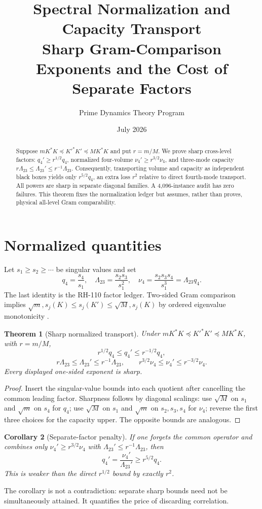 \documentclass[12pt]{article}\usepackage[margin=1in]{geometry}\usepackage{amsmath,amssymb,amsthm,graphicx,natbib,microtype}\newtheorem{theorem}{Theorem}\newtheorem{corollary}[theorem]{Corollary}
\title{Spectral Normalization and Capacity Transport\\\large Sharp Gram-Comparison Exponents and the Cost of Separate Factors}\author{Prime Dynamics Theory Program}\date{July 2026}
\begin{document}
\maketitle
\begin{abstract}
Suppose $mK^*K\preceq K'^*K'\preceq MK^*K$ and put $r=m/M$.  We prove sharp cross-level factors: $q_4'\geq r^{1/2}q_4$, normalized four-volume $\nu_4'\geq r^{3/2}\nu_4$, and three-mode capacity $r\Lambda_{23}\leq\Lambda_{23}'\leq r^{-1}\Lambda_{23}$.  Consequently, transporting volume and capacity as independent black boxes yields only $r^{5/2}q_4$, an extra loss $r^2$ relative to direct fourth-mode transport.  All powers are sharp in separate diagonal families.  A 4,096-instance audit has zero failures.  This theorem fixes the normalization ledger but assumes, rather than proves, physical all-level Gram comparability.
\end{abstract}
\section{Normalized quantities}
Let $s_1\geq s_2\geq\cdots$ be singular values and set
\[
q_4=\frac{s_4}{s_1},\quad \Lambda_{23}=\frac{s_2s_3}{s_1^2},\quad \nu_4=\frac{s_2s_3s_4}{s_1^3}=\Lambda_{23}q_4.
\]
The last identity is the RH-110 factor ledger.  Two-sided Gram comparison
implies $\sqrt m,s_j(K)\leq s_j(K')\leq\sqrt M,s_j(K)$ by ordered
eigenvalue monotonicity \citep{HornJohnson1991,Bhatia2007}.

\begin{theorem}[Sharp normalized transport]\label{thm:transport}
Under $mK^*K\preceq K'^*K'\preceq MK^*K$, with $r=m/M$,
\[
r^{1/2}q_4\leq q_4'\leq r^{-1/2}q_4,
\]
\[
r\Lambda_{23}\leq\Lambda_{23}'\leq r^{-1}\Lambda_{23},\qquad
r^{3/2}\nu_4\leq\nu_4'\leq r^{-3/2}\nu_4.
\]
Every displayed one-sided exponent is sharp.
\end{theorem}
\begin{proof}
Insert the singular-value bounds into each quotient after cancelling the
common leading factor.  Sharpness follows by diagonal scalings: use
$\sqrt M$ on $s_1$ and $\sqrt m$ on $s_4$ for $q_4$; use $\sqrt M$ on
$s_1$ and $\sqrt m$ on $s_2,s_3,s_4$ for $\nu_4$; reverse the first three
choices for the capacity upper.  The opposite bounds are analogous.
\end{proof}

\begin{corollary}[Separate-factor penalty]
If one forgets the common operator and combines only
$\nu_4'\geq r^{3/2}\nu_4$ with
$\Lambda_{23}'\leq r^{-1}\Lambda_{23}$, then
\[
q_4'=\frac{\nu_4'}{\Lambda_{23}'}\geq r^{5/2}q_4.
\]
This is weaker than the direct $r^{1/2}$ bound by exactly $r^2$.
\end{corollary}
The corollary is not a contradiction: separate sharp bounds need not be
simultaneously attained.  It quantifies the price of discarding correlation.
\end{document}
